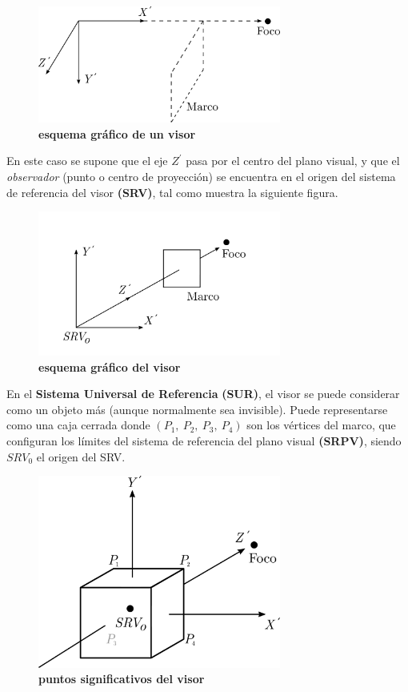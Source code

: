 \begin{figure}[h]
\includegraphics[width=8cm]{Img/GEO/geo-visor0.png}
\centering
    \caption{\footnotesize{\textbf{esquema gráfico de un visor}}}
    \label{geo-visor0}
\end{figure}

En este caso se supone que el eje $Z^{\prime}$ pasa por el centro del plano visual, y que el \textit{observador} (punto o centro de proyección) se encuentra en el origen del sistema de referencia del visor \textbf{(SRV)}, tal como muestra la siguiente figura.

\begin{figure}[h]
\includegraphics[width=8cm]{Img/GEO/geo-visor-1.png}
\centering
    \caption{\footnotesize{\textbf{esquema gráfico del visor}}}
    \label{geo-visor1}
\end{figure}

En el \textbf{Sistema Universal de Referencia} \textbf{(SUR)}, el visor se puede considerar como un objeto más (aunque normalmente sea invisible). Puede representarse como una caja cerrada donde $(P_1, \ P_2, \ P_3, \ P_4)$ son los vértices del marco, que configuran los límites del sistema de referencia del plano visual \textbf{(SRPV)}, siendo $SRV_0$ el origen del SRV.

\begin{figure}[h]
\includegraphics[width=8cm]{Img/GEO/geo-visor-2.png}
\centering
    \caption{\footnotesize{\textbf{puntos significativos del visor}}}
    \label{geo-visor2}
\end{figure}

